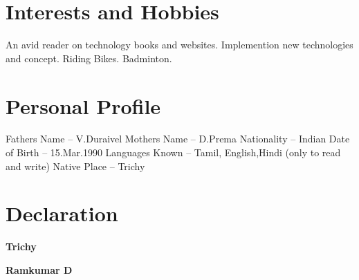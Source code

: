 \documentclass[11pt,a4paper]{moderncv}
\begin{document}

\section{Interests and Hobbies}
\cvlistitem
{\small{An avid reader on technology books and websites.}}
\cvlistitem
{\small{Implemention new technologies and concept.}}
\cvlistitem
{\small{Riding Bikes.}}
\cvlistitem
{\small{Badminton.}}



\section{Personal Profile}
\cvlistitem
{\small{Fathers Name} -- {\small V.Duraivel}}
\cvlistitem
{\small{Mothers Name} -- {\small D.Prema}}
\cvlistitem
{\small{Nationality} -- {\small Indian}}
\cvlistitem
{\small{Date of Birth} -- {\small 15.Mar.1990}}
\cvlistitem
{\small{Languages Known} -- {\small Tamil, English,Hindi (only to read and write)}}
\cvlistitem
{\small{Native Place} -- {\small Trichy}}

\section{Declaration}

\begin{minipage}{0.5\textwidth}
\begin{flushleft}
  \large
\bfseries Trichy
\end{flushleft}
\end{minipage}
\begin{minipage}{0.5\textwidth}

\begin{flushright}
  \large
\bfseries Ramkumar \textsc{D}
\end{flushright}
\end{minipage}

\end{document}
